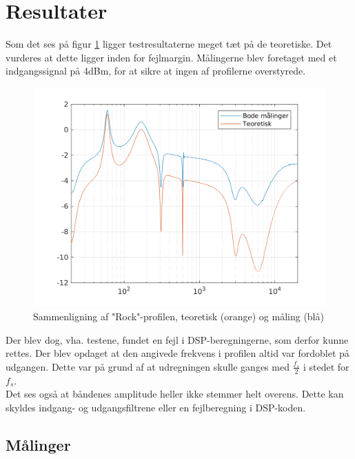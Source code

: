 \section{Resultater}
Som det ses på figur \ref{fig:rock_test} ligger testresultaterne meget tæt på de teoretiske. Det vurderes at dette ligger inden for fejlmargin. Målingerne blev foretaget med et indgangssignal på 4dBm, for at sikre at ingen af profilerne overstyrede.


\begin{figure}[h!]
	\centering
	\includegraphics[width=15cm]{billeder/rock_test}
	\caption{Sammenligning af "Rock"-profilen, teoretisk (orange) og måling (blå)}
	\label{fig:rock_test}
\end{figure}
	

Der blev dog, vha. testene, fundet en fejl i DSP-beregningerne, som derfor kunne rettes. Der blev opdaget at den angivede frekvens i profilen altid var fordoblet på udgangen. Dette var på grund af at udregningen skulle ganges med $\frac{f_s}{2}$ i stedet for $f_s$. \\ 

Det ses også at båndenes amplitude heller ikke stemmer helt overens. Dette kan skyldes indgang- og udgangsfiltrene eller en fejlberegning i DSP-koden. 





\subsection{Målinger}

